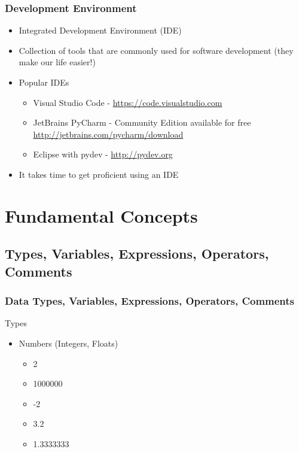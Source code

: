 \documentclass[10pt, a4paper]{beamer} %
\begin{document}
\begin{frame}[c]\frametitle{Development Environment}

  \begin{itemize}
    \item Integrated Development Environment (IDE)
    \item Collection of tools that are commonly used for software development (they make our life easier!)
    \item Popular IDEs
          \begin{itemize}
            \item Visual Studio Code - \url{https://code.visualstudio.com}
            \item JetBrains PyCharm - Community Edition available for free \url{http://jetbrains.com/pycharm/download}
            \item Eclipse with pydev - \url{http://pydev.org}
          \end{itemize}
    \item It takes time to get proficient using an IDE
  \end{itemize}
\end{frame}


\section{Fundamental Concepts} %
\label{sec:fundamental_concepts}

\subsection{Types, Variables, Expressions, Operators, Comments} %
\label{sub:Types_variables_expressions_operators_comments}

\begin{frame}[c]\frametitle{Data Types, Variables, Expressions, Operators, Comments}
  \begin{block}{Types}
    \begin{itemize}
      \item Numbers (Integers, Floats)
            \begin{itemize}
              \item 2
              \item 1000000
              \item -2
              \item 3.2
              \item 1.3333333
            \end{itemize}
    \end{itemize}
  \end{block}

\end{frame}
\end{document}
